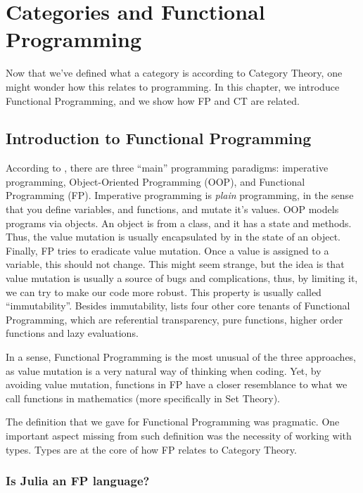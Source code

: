 \chapter{Categories and Functional Programming}

Now that we've defined what a category is according to Category Theory,
one might wonder how this relates to programming. In this chapter,
we introduce Functional Programming,
and we show how FP and CT are related.

\section{Introduction to Functional Programming}

According to \citet{widman2022learning},
there are three ``main'' programming paradigms: imperative programming, Object-Oriented Programming (OOP), and Functional Programming (FP).
Imperative programming is \textit{plain} programming, in the sense that you define variables, and functions, and mutate it's values.
OOP models programs via objects. An object is from a class, and it has a state and methods. Thus, the value mutation is usually
encapsulated by in the state of an object.
Finally, FP tries to eradicate value mutation. Once a value is assigned to a variable, this should not change.
This might seem strange, but the idea is that value mutation is usually a source of bugs and complications, thus,
by limiting it, we can try to make our code more robust. This property is usually called ``immutability''.
Besides immutability, \citet{widman2022learning} lists four other core tenants of Functional Programming,
which are referential transparency,
pure functions, higher order functions and lazy evaluations.

In a sense, Functional Programming is the most unusual of the three approaches, as value mutation
is a very natural way of thinking when coding. Yet, by avoiding value mutation, functions
in FP have a closer resemblance to what we call functions in mathematics (more specifically in Set Theory).

The definition that we gave for Functional Programming was pragmatic. One important
aspect missing from such definition was the necessity of working with types.
Types are at the core of how FP relates to Category Theory.

\subsection{Is Julia an FP language?}

